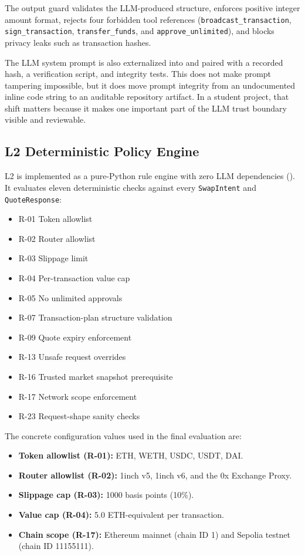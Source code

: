 ﻿\documentclass[conference]{IEEEtran}
\begin{document}
The output guard validates the LLM-produced structure, enforces positive
integer amount format, rejects four forbidden tool references
(\texttt{broadcast\_transaction}, \texttt{sign\_transaction},
\texttt{transfer\_funds}, and \texttt{approve\_unlimited}), and blocks
privacy leaks such as transaction hashes.

The LLM system prompt is also externalized into
 and paired with a recorded hash,
a verification script, and integrity tests. This does not make prompt
tampering impossible, but it does move prompt integrity from an undocumented
inline code string to an auditable repository artifact. In a student project,
that shift matters because it makes one important part of the LLM trust
boundary visible and reviewable.

\subsection{L2 Deterministic Policy Engine}

L2 is implemented as a pure-Python rule engine with zero LLM dependencies
(). It evaluates eleven deterministic checks
against every \texttt{Swap\allowbreak Intent} and \texttt{Quote\allowbreak Response}:

\begin{itemize}
    \item R-01 Token allowlist
    \item R-02 Router allowlist
    \item R-03 Slippage limit
    \item R-04 Per-transaction value cap
    \item R-05 No unlimited approvals
    \item R-07 Transaction-plan structure validation
    \item R-09 Quote expiry enforcement
    \item R-13 Unsafe request overrides
    \item R-16 Trusted market snapshot prerequisite
    \item R-17 Network scope enforcement
    \item R-23 Request-shape sanity checks
\end{itemize}

The concrete configuration values used in the final evaluation are:

\begin{itemize}
    \item \textbf{Token allowlist (R-01):} ETH, WETH, USDC, USDT, DAI.
    \item \textbf{Router allowlist (R-02):} 1inch v5, 1inch v6, and the 0x Exchange Proxy.
    \item \textbf{Slippage cap (R-03):} 1000 basis points (10\%).
    \item \textbf{Value cap (R-04):} 5.0 ETH-equivalent per transaction.
    \item \textbf{Chain scope (R-17):} Ethereum mainnet (chain ID 1) and Sepolia testnet (chain ID 11155111).
\end{itemize}
\end{document}

